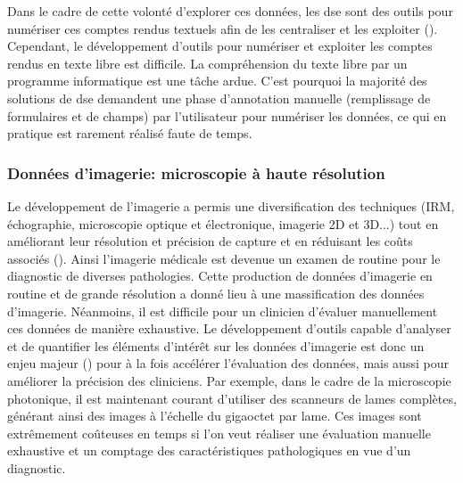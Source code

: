Dans le cadre de cette volonté d'explorer ces données, les \gls{dse} sont des outils pour numériser ces comptes rendus textuels afin de les centraliser et les exploiter (\cite{graber_impact_2017}). Cependant, le développement d'outils pour numériser et exploiter les comptes rendus en texte libre est difficile. La compréhension du texte libre par un programme informatique est une tâche ardue. C'est pourquoi la majorité des solutions de \gls{dse} demandent une phase d'annotation manuelle (remplissage de formulaires et de champs) par l'utilisateur pour numériser les données, ce qui en pratique est rarement réalisé faute de temps.

\subsubsection{Données d'imagerie: microscopie à haute résolution}
Le développement de l'imagerie a permis une diversification des techniques (IRM, échographie, microscopie optique et électronique, imagerie 2D et 3D...) tout en améliorant leur résolution et précision de capture  et en réduisant les coûts associés (\cite{abdallah_history_2017, prakash_super-resolution_2022, sheppard_structured_2021}). Ainsi l'imagerie médicale est devenue un examen de routine pour le diagnostic de diverses pathologies. Cette production de données d'imagerie en routine et de grande résolution a donné lieu à une massification des données d'imagerie. Néanmoins, il est difficile pour un clinicien d'évaluer manuellement ces données de manière exhaustive. Le développement d'outils capable d'analyser et de quantifier les éléments d'intérêt sur les données d'imagerie est donc un enjeu majeur (\cite{tchito_tchapga_biomedical_2021}) pour à la fois accélérer l'évaluation des données, mais aussi pour améliorer la précision des cliniciens. Par exemple, dans le cadre de la microscopie photonique, il est maintenant courant d'utiliser des scanneurs de lames complètes, générant ainsi des images à l'échelle du gigaoctet par lame. Ces images sont extrêmement coûteuses en temps si l’on veut réaliser une évaluation manuelle exhaustive et un comptage des caractéristiques pathologiques en vue d'un diagnostic.

